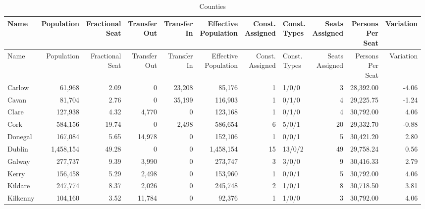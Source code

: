 \documentclass[a4paper]{article}
\begin{document}
\begin{longtable}{lrrrrrrlrrr}
\caption{Counties}
\\ \toprule
Name &Population &\shortstack{Fractional\\Seat} &\shortstack{Transfer\\Out} &\shortstack{Transfer\\In} &\shortstack{Effective\\Population} &\shortstack{Const.\\Assigned} &\shortstack{Const.\\Types} &\shortstack{Seats\\Assigned} &\shortstack{Persons\\Per\\Seat} &Variation \\ \midrule
\endfirsthead
\toprule
Name &Population &\shortstack{Fractional\\Seat} &\shortstack{Transfer\\Out} &\shortstack{Transfer\\In} &\shortstack{Effective\\Population} &\shortstack{Const.\\Assigned} &\shortstack{Const.\\Types} &\shortstack{Seats\\Assigned} &\shortstack{Persons\\Per\\Seat} &Variation \\ \midrule
\endhead
\bottomrule
\endfoot
Carlow&61,968& 2.09&0&23,208&85,176&1&1/0/0&3&28,392.00&-4.06\\ 
Cavan&81,704& 2.76&0&35,199&116,903&1&0/1/0&4&29,225.75&-1.24\\ 
Clare&127,938& 4.32&4,770&0&123,168&1&0/1/0&4&30,792.00& 4.06\\ 
Cork&584,156&19.74&0&2,498&586,654&6&5/0/1&20&29,332.70&-0.88\\ 
Donegal&167,084& 5.65&14,978&0&152,106&1&0/0/1&5&30,421.20& 2.80\\ 
Dublin&1,458,154&49.28&0&0&1,458,154&15&13/0/2&49&29,758.24& 0.56\\ 
Galway&277,737& 9.39&3,990&0&273,747&3&3/0/0&9&30,416.33& 2.79\\ 
Kerry&156,458& 5.29&2,498&0&153,960&1&0/0/1&5&30,792.00& 4.06\\ 
Kildare&247,774& 8.37&2,026&0&245,748&2&1/0/1&8&30,718.50& 3.81\\ 
Kilkenny&104,160& 3.52&11,784&0&92,376&1&1/0/0&3&30,792.00& 4.06\\ 

\end{longtable}
\end{document}
